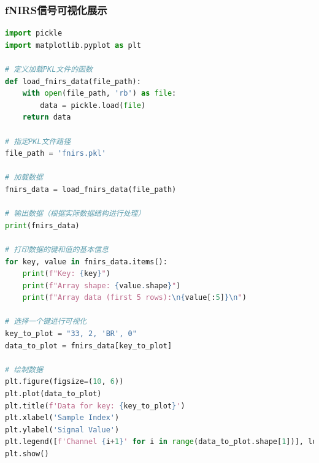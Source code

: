 \documentclass[a4paper,12pt]{article}
\begin{document}
\subsubsection{fNIRS信号可视化展示}
\begin{lstlisting}[language=python]
import pickle
import matplotlib.pyplot as plt

# 定义加载PKL文件的函数
def load_fnirs_data(file_path):
    with open(file_path, 'rb') as file:
        data = pickle.load(file)
    return data

# 指定PKL文件路径
file_path = 'fnirs.pkl'

# 加载数据
fnirs_data = load_fnirs_data(file_path)

# 输出数据（根据实际数据结构进行处理）
print(fnirs_data)

# 打印数据的键和值的基本信息
for key, value in fnirs_data.items():
    print(f"Key: {key}")
    print(f"Array shape: {value.shape}")
    print(f"Array data (first 5 rows):\n{value[:5]}\n")

# 选择一个键进行可视化
key_to_plot = "33, 2, 'BR', 0"
data_to_plot = fnirs_data[key_to_plot]

# 绘制数据
plt.figure(figsize=(10, 6))
plt.plot(data_to_plot)
plt.title(f'Data for key: {key_to_plot}')
plt.xlabel('Sample Index')
plt.ylabel('Signal Value')
plt.legend([f'Channel {i+1}' for i in range(data_to_plot.shape[1])], loc='upper right')
plt.show()

\end{lstlisting}
\end{document}
